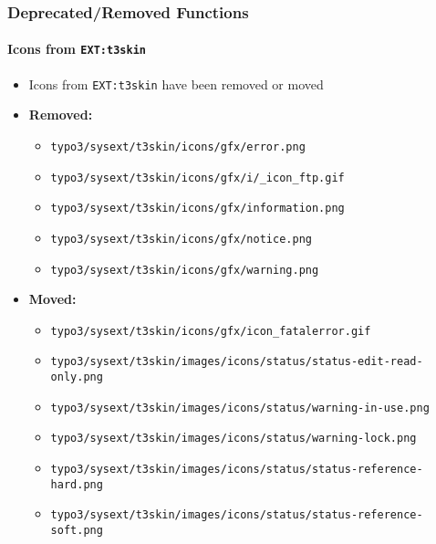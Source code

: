 
\begin{frame}[fragile]
	\frametitle{Deprecated/Removed Functions}
	\framesubtitle{Icons from \texttt{EXT:t3skin}}

	\begin{itemize}

		\item Icons from \texttt{EXT:t3skin} have been removed or moved
		\item \textbf{Removed:}

			\begin{itemize}
				\item \smaller\texttt{typo3/sysext/t3skin/icons/gfx/error.png}
				\item \texttt{typo3/sysext/t3skin/icons/gfx/i/\_icon\_ftp.gif}
				\item \texttt{typo3/sysext/t3skin/icons/gfx/information.png}
				\item \texttt{typo3/sysext/t3skin/icons/gfx/notice.png}
				\item \texttt{typo3/sysext/t3skin/icons/gfx/warning.png}
			\end{itemize}

		\item \textbf{Moved:}

			\begin{itemize}
				\item \smaller\texttt{typo3/sysext/t3skin/icons/gfx/icon\_fatalerror.gif}
				\item \texttt{typo3/sysext/t3skin/images/icons/status/status-edit-read-only.png}
				\item \texttt{typo3/sysext/t3skin/images/icons/status/warning-in-use.png}
				\item \texttt{typo3/sysext/t3skin/images/icons/status/warning-lock.png}
				\item \texttt{typo3/sysext/t3skin/images/icons/status/status-reference-hard.png}
				\item \texttt{typo3/sysext/t3skin/images/icons/status/status-reference-soft.png}
			\end{itemize}

	\end{itemize}

\end{frame}

